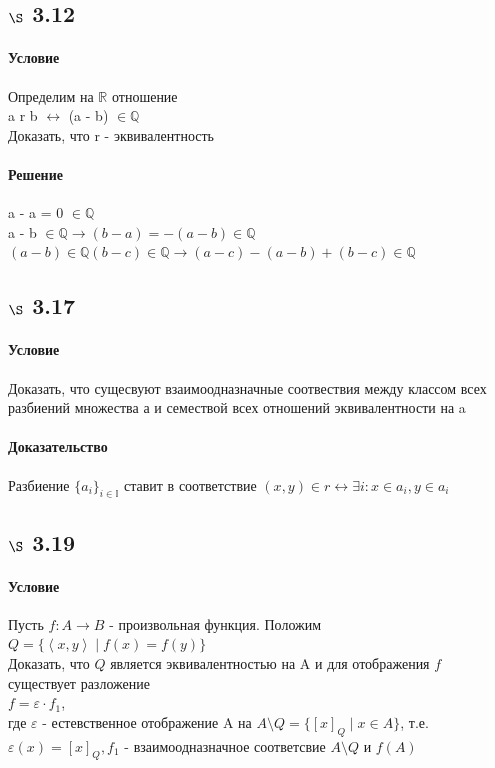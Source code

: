 \documentclass[a4paper,12pt]{article}
\begin{document}
\subsection*{$\S$ 3.12}
\paragraph*{Условие}
Определим на $\mathbb{R}$ отношение\\
 a r b $\leftrightarrow$ (a - b) $ \in \mathbb{Q}$\\
Доказать, что r - эквивалентность
\paragraph*{Решение}
a - a = 0 $ \in \mathbb{Q}$\\
a - b $ \in \mathbb{Q} \rightarrow (b - a)=-(a - b) \in \mathbb{Q}$\\
$(a - b) \in \mathbb{Q} (b - c)  \in \mathbb{Q} \rightarrow (a - c) - (a - b) + (b - c) \in \mathbb{Q}$ 

\subsection*{$\S$ 3.17}
\paragraph*{Условие}
Доказать, что сущесвуют взаимоодназначные соотвествия между классом всех разбиений множества а и семествой всех отношений эквивалентности на a
\paragraph*{Доказательство}
Разбиение $\{a_i\}_{i\in\mathbb{I}}$ ставит в соответствие $(x, y) \in r \leftrightarrow \exists i: x \in a_i , y \in a_i$

\subsection*{$\S$ 3.19}
\paragraph*{Условие}
Пусть $ f: A \rightarrow B $ - произвольная функция. Положим\\
$ Q = \{\left\langle x, y \right\rangle \mid f(x)=f(y)  \}$\\
Доказать, что $Q$ является эквивалентностью на A и для отображения $ f $ существует разложение\\
$ f = \varepsilon \cdot f_1 $, \\
где $ \varepsilon $ - естевственное отображение A на $A \setminus Q = \{ [x]_Q \mid x \in A\}$, т.е. \\
$ \varepsilon (x) =[x]_Q , f_1 $ - взаимоодназначное соответсвие $ A \setminus Q$ и $f(A)$
\end{document}
